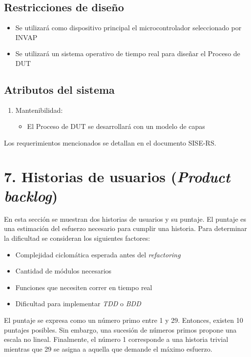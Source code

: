 \documentclass[
11pt, %
]{charter}
\begin{document}
\subsection{Restricciones de diseño}
\label{sub:restriccionesDiseño}

\begin{itemize}
	\item Se utilizará como dispositivo principal el microcontrolador seleccionado por INVAP
	\item Se utilizará un sistema operativo de tiempo real para diseñar el Proceso de DUT
\end{itemize}

\subsection{Atributos del sistema}
\label{sub:atributos}

\begin{enumerate}
	\item Mantenibilidad:
	\begin{itemize}
		\item El Proceso de DUT se desarrollará con un modelo de capas
	\end{itemize}
\end{enumerate}

Los requerimientos mencionados se detallan en el documento SISE-RS.

\section{7. Historias de usuarios (\textit{Product backlog})}
\label{sec:backlog}

En esta sección se muestran dos historias de usuarios y su puntaje.
El puntaje es una estimación del esfuerzo necesario para cumplir una historia.
Para determinar la dificultad se consideran los siguientes factores:

\begin{itemize}
	\item Complejidad ciclomática esperada antes del \emph{refactoring}
	\item Cantidad de módulos necesarios
	\item Funciones que necesiten correr en tiempo real
	\item Dificultad para implementar \emph{TDD} o \emph{BDD}
\end{itemize}

El puntaje se expresa como un número primo entre 1 y 29.
Entonces, existen 10 puntajes posibles.
Sin embargo, una sucesión de números primos propone una escala no lineal.
Finalmente, el número 1 corresponde a una historia trivial mientras que 29 se asigna a aquella que demande el máximo esfuerzo.
\end{document}
